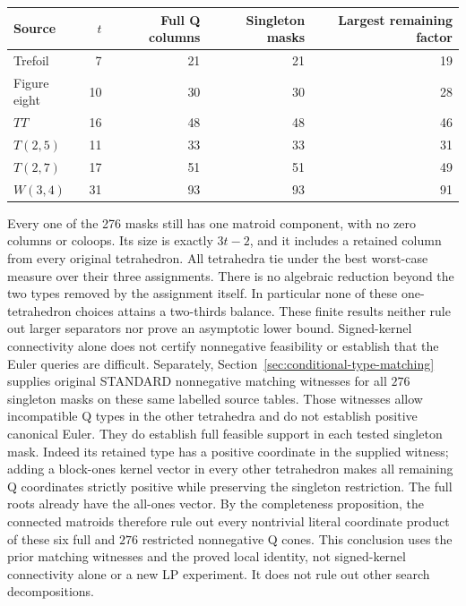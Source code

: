 \begin{center}
\begin{tabular}{lrrrr}
\toprule
Source & $t$ & Full Q columns & Singleton masks & Largest remaining factor\\
\midrule
Trefoil & 7 & 21 & 21 & 19\\
Figure eight & 10 & 30 & 30 & 28\\
$TT$ & 16 & 48 & 48 & 46\\
$T(2,5)$ & 11 & 33 & 33 & 31\\
$T(2,7)$ & 17 & 51 & 51 & 49\\
$W(3,4)$ & 31 & 93 & 93 & 91\\
\bottomrule
\end{tabular}
\end{center}

Every one of the 276 masks still has one matroid component, with no zero
columns or coloops.  Its size is exactly $3t-2$, and it includes a retained
column from every original tetrahedron.  All tetrahedra tie under the
best worst-case measure over their three assignments.  There is no algebraic
reduction beyond the two types removed by the assignment itself.
In particular none of these one-tetrahedron choices attains a two-thirds
balance.  These finite results neither rule out larger separators nor prove
an asymptotic lower bound.  Signed-kernel connectivity alone does not certify
nonnegative feasibility or establish that the Euler queries are difficult.
Separately, Section~\ref{sec:conditional-type-matching} supplies original
STANDARD nonnegative matching witnesses for all $276$ singleton masks on
these same labelled source tables.  Those witnesses allow incompatible Q
types in the other tetrahedra and do not establish positive canonical Euler.
They do establish full feasible support in each tested singleton mask.
Indeed its retained type has a positive coordinate in the supplied witness;
adding a block-ones kernel vector in every other tetrahedron makes all
remaining Q coordinates strictly positive while preserving the singleton
restriction.  The full roots already have the all-ones vector.  By the
completeness proposition, the connected matroids therefore rule out every
nontrivial literal coordinate product of these six full and $276$ restricted
nonnegative Q cones.  This conclusion uses the prior matching witnesses and
the proved local identity, not signed-kernel connectivity alone or a new LP
experiment.  It does not rule out other search decompositions.

